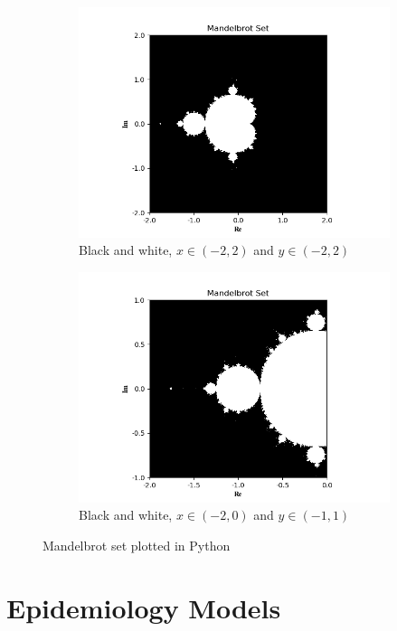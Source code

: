 \documentclass{article}
\begin{document}
\begin{figure}[H]
\begin{subfigure}{.5\textwidth}
  \includegraphics[width=\textwidth]{Mandelbrot_3.png}
  \caption{Black and white, $x \in (-2,2)$ and $y \in (-2,2)$}
  \label{fig:sub3}
\end{subfigure}%
\begin{subfigure}{.5\textwidth}
  \centering
  \includegraphics[width=\textwidth]{Mandelbrot_4.png}
  \caption{Black and white, $x \in (-2,0)$ and $y \in (-1,1)$}
  \label{fig:sub4}
\end{subfigure}

\caption{Mandelbrot set plotted in Python}
\label{fig:test1}
\end{figure}

\section{Epidemiology Models}
\end{document}
